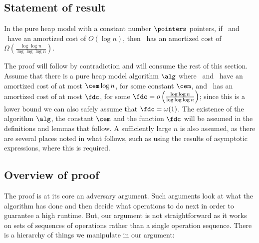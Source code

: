 \subsection{Statement of result} 

\begin{theorem} 
In the pure heap model with a constant number $\pointers$ pointers, if\/ \opEm\ and \opIns\ have an amortized cost of $O(\log n)$, then \opDc\ has an amortized cost of $\Omega \left( \frac{\log \log n}{\log \log \log n} \right)$.\end{theorem}

The proof will follow by contradiction and will consume the rest of this section. Assume that there is a pure heap model algorithm $\alg$ where \opEm\ and \opIns\ have an amortized cost of at most $\cem \log n$, for some constant $\cem$, and \opDc\ has an amortized cost of at most  $\fdc$, for some $\fdc=o\left( \frac{\log \log n}{\log \log \log n} \right)$; since this is a lower bound we can also safely assume that $\fdc=\omega(1)$. 
The existence of the algorithm  $\alg$,  the constant $\cem$ and the function $\fdc$ will be assumed in the definitions and lemmas that follow. A sufficiently large $n$ is also assumed, as there are several places noted in what follows, such as using the results of asymptotic expressions, where this is required.

\subsection{Overview of proof}

The proof is at its core an adversary argument. Such arguments look at what the algorithm has done and then decide what operations to do next in order to guarantee a high runtime. But, our argument is not straightforward as it works on sets of sequences of operations rather than a single operation sequence. There is a hierarchy of things we manipulate in our argument:

\begin{fullonly}
\begin{description}
\end{fullonly}

